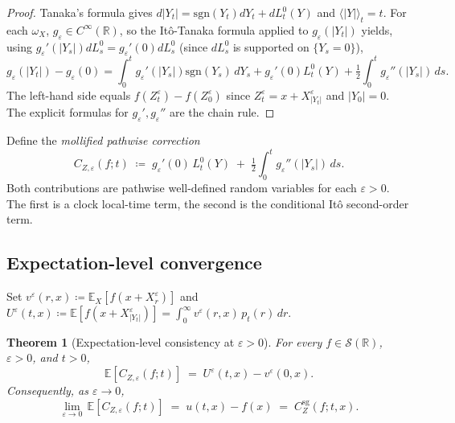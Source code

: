 \documentclass[11pt,reqno]{amsart}
\theoremstyle{plain}
\newtheorem{theorem}{Theorem}[section]
\theoremstyle{definition}
\theoremstyle{remark}
\newcommand{\R}{\mathbb{R}}
\newcommand{\E}{\mathbb{E}}
\newcommand{\IBM}{Z}
\begin{document}
\begin{proof}
Tanaka's formula gives $d|Y_t|=\mathrm{sgn}(Y_t)dY_t+dL_t^{0}(Y)$ and
$\langle|Y|\rangle_t=t$. For each $\omega_X$, $g_\varepsilon\in C^\infty(\R)$,
so the It\^o-Tanaka formula applied to $g_\varepsilon(|Y_t|)$ yields,
using $g_\varepsilon'(|Y_s|)dL_s^{0}=g_\varepsilon'(0)dL_s^{0}$
(since $dL_s^{0}$ is supported on $\{Y_s=0\}$),
\[
  g_\varepsilon(|Y_t|)-g_\varepsilon(0)
  =\!\int_0^t\!\! g_\varepsilon'(|Y_s|)\mathrm{sgn}(Y_s)\,dY_s
   +g_\varepsilon'(0)L_t^{0}(Y)
   +\tfrac12\!\int_0^t\!\! g_\varepsilon''(|Y_s|)\,ds.
\]
The left-hand side equals $f(Z_t^\varepsilon)-f(Z_0^\varepsilon)$ since
$Z_t^\varepsilon=x+X^\varepsilon_{|Y_t|}$ and $|Y_0|=0$. The explicit
formulas for $g_\varepsilon',g_\varepsilon''$ are the chain rule.
\end{proof}

Define the \emph{mollified pathwise correction}
\begin{equation}\label{eq:moll-correction}
  C_{\IBM,\varepsilon}(f;t)
  \;\coloneqq\;
  g_\varepsilon'(0)\,L_t^{0}(Y)\;+\;\tfrac12\!\int_0^t\!\!
   g_\varepsilon''(|Y_s|)\,ds.
\end{equation}
Both contributions are pathwise well-defined random variables for each
$\varepsilon>0$. The first is a clock local-time term, the second is
the conditional It\^o second-order term.

\subsection*{Expectation-level convergence}

Set $v^\varepsilon(r,x)\coloneqq\E_X[f(x+X^\varepsilon_r)]$ and
$U^\varepsilon(t,x)\coloneqq\E[f(x+X^\varepsilon_{|Y_t|})]
=\int_0^\infty v^\varepsilon(r,x)\,p_t(r)\,dr$.

\begin{theorem}[Expectation-level consistency at $\varepsilon>0$]
\label{thm:moll-consistency}
For every $f\in\mathscr S(\R)$, $\varepsilon>0$, and $t>0$,
\begin{equation}\label{eq:moll-exp-id}
  \E[C_{\IBM,\varepsilon}(f;t)]
   \;=\;U^\varepsilon(t,x)-v^\varepsilon(0,x).
\end{equation}
Consequently, as $\varepsilon\to 0$,
\begin{equation}\label{eq:moll-limit}
  \lim_{\varepsilon\to 0}\,\E[C_{\IBM,\varepsilon}(f;t)]
   \;=\;u(t,x)-f(x)
   \;=\;C_\IBM^{\mathrm{sg}}(f;t,x).
\end{equation}
\end{theorem}
\end{document}
